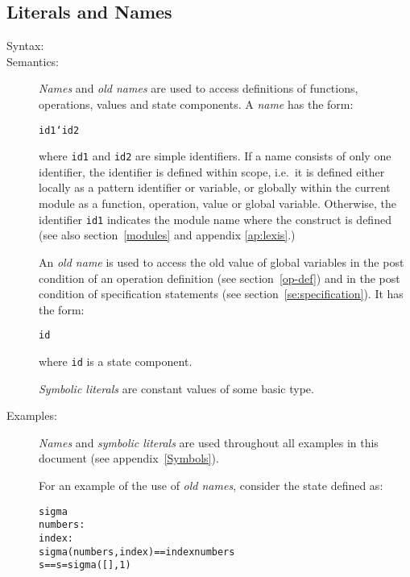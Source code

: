 \documentclass[\pformat,12pt]{article}
\begin{document}
\subsection{Literals and Names}

\begin{description}
\item[Syntax:]




\item[Semantics:] {\it Names\/} and {\it old names\/} are used to access
  definitions of functions, operations, values and state components. A {\it
    name\/} has the form:
  \begin{alltt}
    id1`id2
  \end{alltt}
  where {\tt id1} and {\tt id2} are simple identifiers. If a name consists
  of only one identifier, the identifier is defined within scope, i.e.\ it
  is defined either locally as a pattern identifier or variable,
  or globally within the current module as a function, operation,
  value or global variable. 
  Otherwise, the identifier {\tt id1} indicates the
module name
where the
  construct is defined (see also
  section~\ref{modules}
and appendix \ref{ap:lexis}.)

  An {\it old name\/} is used to access the old value of global
  variables in the post condition of an operation definition (see
  section~\ref{op-def}) and in the post condition of specification
  statements (see section~\ref{se:specification}).  It has the form:

  \begin{alltt} 
    id~ 
  \end{alltt} 
  where {\tt id} is a state component.

  {\it Symbolic literals\/} are constant values of some basic type.

\item[Examples:] {\it Names} and {\it symbolic literals\/} are used
  throughout all examples in this document (see appendix~\ref{Symbols}).

  For an example of the use of {\it old names}, consider the state defined
  as:
  \begin{alltt}
     sigma 
      numbers : 
      index   : 
      sigma(numbers, index) == index  numbers
     s == s = sigma([], 1)
  \end{alltt}


\end{description}
\end{document}
